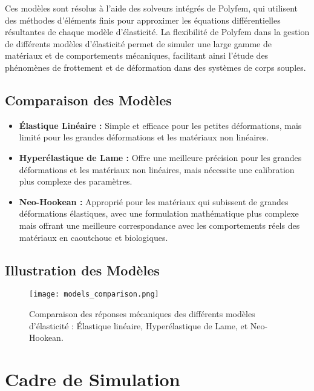 Ces modèles sont résolus à l’aide des solveurs intégrés de Polyfem, qui utilisent des méthodes d’éléments finis pour approximer les équations différentielles résultantes de chaque modèle d’élasticité. La flexibilité de Polyfem dans la gestion de différents modèles d’élasticité permet de simuler une large gamme de matériaux et de comportements mécaniques, facilitant ainsi l’étude des phénomènes de frottement et de déformation dans des systèmes de corps souples.

\subsection{Comparaison des Modèles}

\begin{itemize}
    \item \textbf{Élastique Linéaire :} Simple et efficace pour les petites déformations, mais limité pour les grandes déformations et les matériaux non linéaires.
    \item \textbf{Hyperélastique de Lame :} Offre une meilleure précision pour les grandes déformations et les matériaux non linéaires, mais nécessite une calibration plus complexe des paramètres.
    \item \textbf{Neo-Hookean :} Approprié pour les matériaux qui subissent de grandes déformations élastiques, avec une formulation mathématique plus complexe mais offrant une meilleure correspondance avec les comportements réels des matériaux en caoutchouc et biologiques.
\end{itemize}

\subsection{Illustration des Modèles}

\begin{figure}[h]
    \centering
    \texttt{[image: models\_comparison.png]}
    \caption{Comparaison des réponses mécaniques des différents modèles d'élasticité : Élastique linéaire, Hyperélastique de Lame, et Neo-Hookean.}
    \label{fig:models_comparison}
\end{figure}

\section{Cadre de Simulation}

